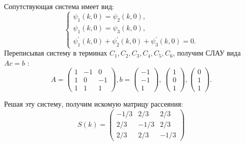 \documentclass[a4 paper, 12 pt]{extarticle}
\begin{document}
  Сопутствующая система имеет вид:
  \[\begin{cases}
  \psi_{1}\left(k,0\right)=\psi_2\left(k,0\right), \\
  \psi_{1}\left(k,0\right)=\psi_3\left(k,0\right), \\
  \psi_1^\prime\left(k,0\right)+\psi_2^\prime\left(k,0\right)+\psi_3^\prime\left(k,0\right)=0.
  \end{cases}
  \]
   Переписывая систему в терминах $C_1,C_2,C_3,C_4,C_5,C_6$, получим СЛАУ вида $Ac=b$ :
   \[ A = \left(\begin{smallmatrix}
   1 & -1 & 0 \\
   1 & 0 & -1 \\
   1 & 1 & 1
   \end{smallmatrix}\right), b = \left(\begin{smallmatrix}
   -1 \\
   -1 \\
   1
   \end{smallmatrix}\right), \ 
   \left(\begin{smallmatrix}
   1 \\
   0 \\
   1
   \end{smallmatrix}\right),
   \left(\begin{smallmatrix}
   0 \\
   1 \\
   1
   \end{smallmatrix}\right).\]
   
   Решая эту систему, получим искомую матрицу рассеяния:
   \[
   S(k)=
   \begin{pmatrix}
   -1/3 & 2/3 & 2/3 \\
   2/3 & -1/3 & 2/3 \\
   2/3 & 2/3 & -1/3 
   \end{pmatrix}
   \]
   
\end{document}
